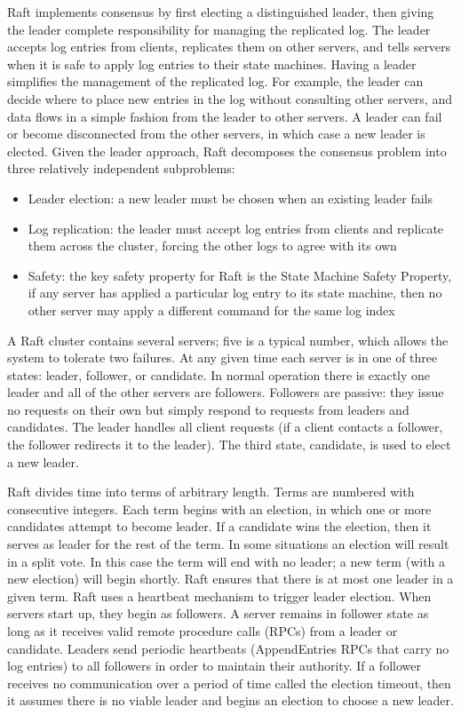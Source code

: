 \documentclass[12pt,letterpaper]{article}
\begin{document}
Raft implements consensus by first electing a distinguished leader, then giving the leader complete responsibility for managing the replicated log. The leader accepts log entries from clients, replicates them on other servers, and tells servers when it is safe to apply log entries to their state machines. Having a leader simplifies the management of the replicated log. For example, the leader can decide where to place new entries in the log without consulting other servers, and data flows in a simple fashion from the leader to other servers. A leader can fail or become disconnected from the other servers, in which case a new leader is elected. Given the leader approach, Raft decomposes the consensus problem into three relatively independent subproblems:
\begin{itemize}
    \item Leader election: a new leader must be chosen when an
existing leader fails
    \item Log replication: the leader must accept log entries
from clients and replicate them across the cluster, forcing the other logs to agree with its own
    \item Safety: the key safety property for Raft is the State Machine Safety Property, if any server has applied a particular log entry to its state machine, then no other server may apply a different command for the same log index
\end{itemize}

A Raft cluster contains several servers; five is a typical number, which allows the system to tolerate two failures. At any given time each server is in one of three states: leader, follower, or candidate. In normal operation there is exactly one leader and all of the other servers are followers. Followers are passive: they issue no requests on their own but simply respond to requests from leaders and candidates. The leader handles all client requests (if a client contacts a follower, the follower redirects it to the leader). The third state, candidate, is used to elect a new leader.

Raft divides time into terms of arbitrary length. Terms are numbered with consecutive integers. Each term begins with an election, in which one or more candidates attempt to become leader. If a candidate wins the election, then it serves as leader for the rest of the term. In some situations an election will result in a split vote. In this case the term will end with no leader; a new term (with a new election) will begin shortly. Raft ensures that there is at most one leader in a given term. Raft uses a heartbeat mechanism to trigger leader election. When servers start up, they begin as followers. A server remains in follower state as long as it receives valid remote procedure calls (RPCs) from a leader or candidate. Leaders send periodic heartbeats (AppendEntries RPCs that carry no log entries) to all followers in order to maintain their authority. If a follower receives no communication over a period of time called the election timeout, then it assumes there is no viable leader and begins an election to choose a new leader.
\end{document}
